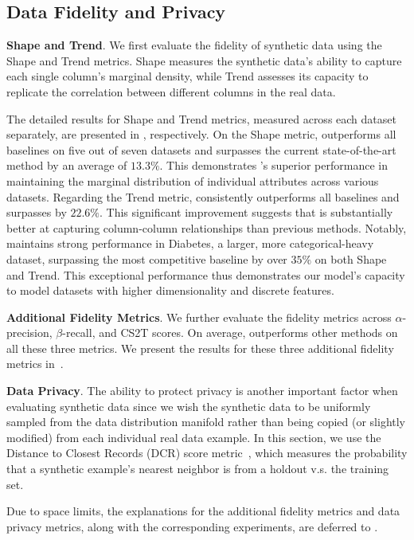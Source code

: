\subsection{Data Fidelity and Privacy}
\textbf{Shape and Trend}. 
We first evaluate the fidelity of synthetic data using the Shape and Trend metrics. Shape measures the synthetic data's ability to capture each single column's marginal density, while Trend assesses its capacity to replicate the correlation between different columns in the real data.

The detailed results for Shape and Trend metrics, measured across each dataset separately, are presented in , respectively.
On the Shape metric, \method outperforms all baselines on five out of seven datasets and surpasses the current state-of-the-art method \tabsyn by an average of $13.3\%$. This demonstrates \method's superior performance in maintaining the marginal distribution of individual attributes across various datasets.
Regarding the Trend metric, \method consistently outperforms all baselines and surpasses \tabsyn by $22.6\%$. This significant improvement suggests that \method is substantially better at capturing column-column relationships than previous methods. Notably, \method maintains strong performance in Diabetes, a larger, more categorical-heavy dataset, surpassing the most competitive baseline by over $35\%$ on both Shape and Trend. This exceptional performance thus demonstrates our model's capacity to model datasets with higher dimensionality and discrete features.

\textbf{Additional Fidelity Metrics}. We further evaluate the fidelity metrics across $\alpha$-precision, $\beta$-recall, and CS2T scores. On average, \method outperforms other methods on all these three metrics. We present the results for these three additional fidelity metrics in~.


\textbf{Data Privacy}. The ability to protect privacy is another important factor when evaluating synthetic data since we wish the synthetic data to be uniformly sampled from the data distribution manifold rather than being copied (or slightly modified) from each individual real data example. In this section, we use the Distance to Closest Records (DCR) score metric~\citep{zhang2024mixedtype}, which measures the probability that a synthetic example's nearest neighbor is from a holdout v.s. the training set.

Due to space limits, the explanations for the additional fidelity metrics and data privacy metrics, along with the corresponding experiments, are deferred to .

